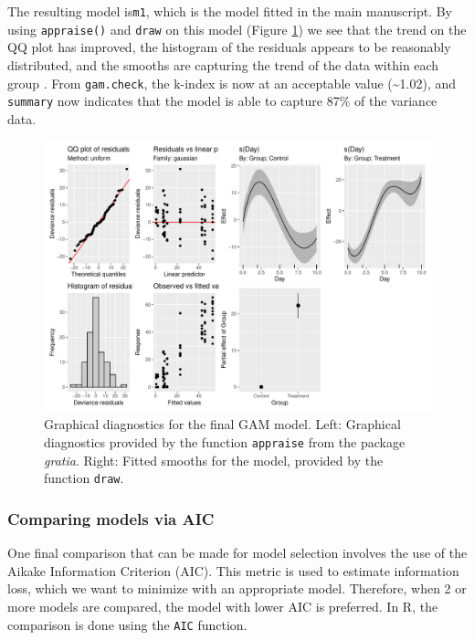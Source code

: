 \documentclass[
]{article}
\newcommand{\passthrough}[1]{#1}
\begin{document}
The resulting model is\passthrough{\lstinline!m1!}, which is the model fitted in the main manuscript. By using \passthrough{\lstinline!appraise()!} and \passthrough{\lstinline!draw!} on this model (Figure \ref{fig:final-GAM-diag}) we see that the trend on the QQ plot has improved, the histogram of the residuals appears to be reasonably distributed, and the smooths are capturing the trend of the data within each group . From \passthrough{\lstinline!gam.check!}, the k-index is now at an acceptable value (\textasciitilde{}1.02), and \passthrough{\lstinline!summary!} now indicates that the model is able to capture 87\% of the variance data.



\begin{figure}[H]

{\centering \includegraphics[width=0.75\linewidth,]{Full_document_files/figure-latex/final-GAM-diag-1} 

}

\caption{Graphical diagnostics for the final GAM model. Left: Graphical diagnostics provided by the function \passthrough{\lstinline!appraise!} from the package \emph{gratia}. Right: Fitted smooths for the model, provided by the function \passthrough{\lstinline!draw!}.}\label{fig:final-GAM-diag}
\end{figure}

\hypertarget{comparing-models-via-aic}{%
\subsubsection{Comparing models via AIC}\label{comparing-models-via-aic}}

One final comparison that can be made for model selection involves the use of the Aikake Information Criterion (AIC). This metric is used to estimate information loss, which we want to minimize with an appropriate model. Therefore, when 2 or more models are compared, the model with lower AIC is preferred. In R, the comparison is done using the \passthrough{\lstinline!AIC!} function.
\end{document}
